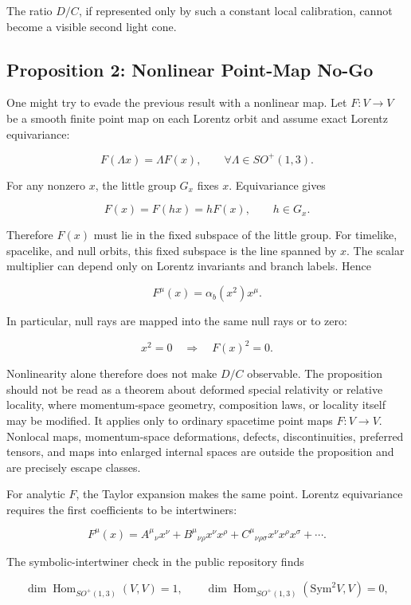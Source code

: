 \documentclass[11pt]{article}
\begin{document}
The ratio \(D/C\), if represented only by such a constant local calibration, cannot become a visible second light cone.


\subsection{Proposition 2: Nonlinear Point-Map No-Go}


One might try to evade the previous result with a nonlinear map. Let \(F:V\to V\) be a smooth finite point map on each Lorentz orbit and assume exact Lorentz equivariance:


\[
F(\Lambda x)=\Lambda F(x),\qquad \forall \Lambda\in SO^+(1,3).
\]


For any nonzero \(x\), the little group \(G_x\) fixes \(x\). Equivariance gives


\[
F(x)=F(hx)=hF(x),\qquad h\in G_x.
\]


Therefore \(F(x)\) must lie in the fixed subspace of the little group. For timelike, spacelike, and null orbits, this fixed subspace is the line spanned by \(x\). The scalar multiplier can depend only on Lorentz invariants and branch labels. Hence


\[
F^\mu(x)=\alpha_b(x^2)x^\mu .
\]


In particular, null rays are mapped into the same null rays or to zero:


\[
x^2=0\quad\Rightarrow\quad F(x)^2=0 .
\]


Nonlinearity alone therefore does not make \(D/C\) observable. The proposition should not be read as a theorem about deformed special relativity or relative locality, where momentum-space geometry, composition laws, or locality itself may be modified. It applies only to ordinary spacetime point maps \(F:V\to V\). Nonlocal maps, momentum-space deformations, defects, discontinuities, preferred tensors, and maps into enlarged internal spaces are outside the proposition and are precisely escape classes.


For analytic \(F\), the Taylor expansion makes the same point. Lorentz equivariance requires the first coefficients to be intertwiners:


\[
F^\mu(x)=A^\mu{}_\nu x^\nu
+B^\mu{}_{\nu\rho}x^\nu x^\rho
+C^\mu{}_{\nu\rho\sigma}x^\nu x^\rho x^\sigma+\cdots .
\]


The symbolic-intertwiner check in the public repository finds


\[
\dim\operatorname{Hom}_{SO^+(1,3)}(V,V)=1,\qquad
\dim\operatorname{Hom}_{SO^+(1,3)}(\mathrm{Sym}^2V,V)=0,
\]
\end{document}
